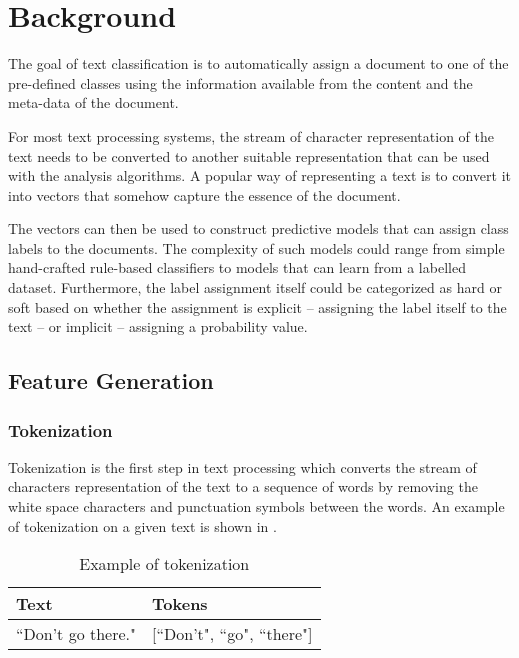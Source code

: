 \chapter{Background} \label{background}
The goal of text classification is to automatically assign a document to one of the pre-defined classes using the information available from the content and the meta-data of the document.

For most text processing systems, the stream of character representation of the text needs to be converted to another suitable representation that can be used with the analysis algorithms. A popular way of representing a text is to convert it into vectors that somehow capture the essence of the document. 

The vectors can then be used to construct predictive models that can assign class labels to the documents. The complexity of such models could range from simple hand-crafted rule-based classifiers to models that can learn from a labelled dataset. Furthermore, the label assignment itself could be categorized as hard or soft based on whether the assignment is explicit -- assigning the label itself to the text -- or implicit -- assigning a probability value. 

\section{Feature Generation}
\subsection{Tokenization}
Tokenization is the first step in text processing which converts the stream of characters representation of the text to a sequence of words by removing the white space characters and punctuation symbols between the words. An example of tokenization on a given text is shown in .

\begin{table}[h]
\begin{center}
\caption{Example of tokenization}
\label{tbl:tokenization_example}
\begin{tabular}{p{6cm}p{6cm}}
\toprule 
Text&Tokens\\
\midrule 
``Don't go there."&[``Don't", ``go", ``there"]\\
\bottomrule
\end{tabular}
\end{center}
\end{table}

